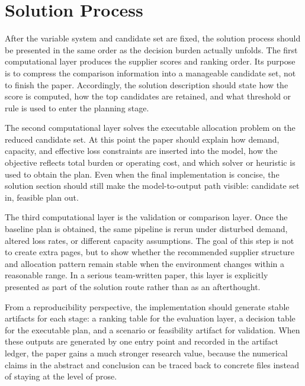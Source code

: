 \section{Solution Process}

After the variable system and candidate set are fixed, the solution process should be presented in the same order as the decision burden actually unfolds. The first computational layer produces the supplier scores and ranking order. Its purpose is to compress the comparison information into a manageable candidate set, not to finish the paper. Accordingly, the solution description should state how the score is computed, how the top candidates are retained, and what threshold or rule is used to enter the planning stage.

The second computational layer solves the executable allocation problem on the reduced candidate set. At this point the paper should explain how demand, capacity, and effective loss constraints are inserted into the model, how the objective reflects total burden or operating cost, and which solver or heuristic is used to obtain the plan. Even when the final implementation is concise, the solution section should still make the model-to-output path visible: candidate set in, feasible plan out.

The third computational layer is the validation or comparison layer. Once the baseline plan is obtained, the same pipeline is rerun under disturbed demand, altered loss rates, or different capacity assumptions. The goal of this step is not to create extra pages, but to show whether the recommended supplier structure and allocation pattern remain stable when the environment changes within a reasonable range. In a serious team-written paper, this layer is explicitly presented as part of the solution route rather than as an afterthought.

From a reproducibility perspective, the implementation should generate stable artifacts for each stage: a ranking table for the evaluation layer, a decision table for the executable plan, and a scenario or feasibility artifact for validation. When these outputs are generated by one entry point and recorded in the artifact ledger, the paper gains a much stronger research value, because the numerical claims in the abstract and conclusion can be traced back to concrete files instead of staying at the level of prose.
